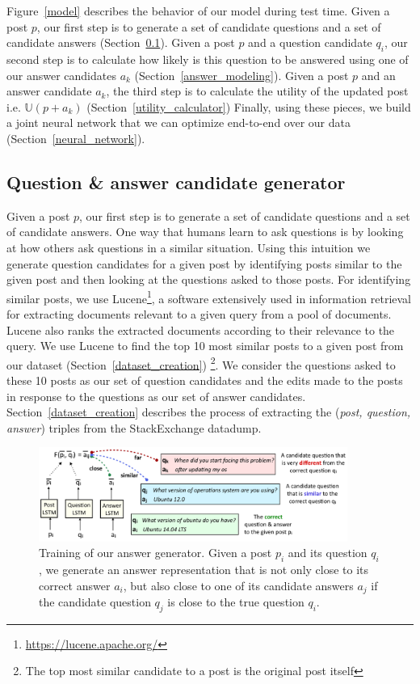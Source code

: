 \documentclass[11pt,a4paper]{article}
\newcommand{\U}{\mathbb{U}}
\begin{document}
Figure~\ref{model} describes the behavior of our model during test time. 
Given a post $p$, our first step is to generate a set of candidate questions and a set of candidate answers (Section~\ref{question_candidate_generator}).
Given a post $p$ and a question candidate $q_i$, our second step is to calculate how likely is this question to be answered using one of our answer candidates $a_k$ (Section~\ref{answer_modeling}).
Given a post $p$ and an answer candidate $a_k$, the third step is to calculate the utility of the updated post i.e. $\U(p + a_k)$ (Section~\ref{utility_calculator})
Finally, using these pieces, we build a joint neural network that we can optimize end-to-end over our data (Section~\ref{neural_network}).

\subsection{Question \& answer candidate generator}\label{question_candidate_generator}

Given a post $p$, our first step is to generate a set of candidate questions and a set of candidate answers. One way that humans learn to ask questions is by looking at how others ask questions in a similar situation. Using this intuition we generate question candidates for a given post by identifying posts similar to the given post and then looking at the questions asked to those posts. For identifying similar posts, we use Lucene\footnote{\url{https://lucene.apache.org/}}, a software extensively used in information retrieval for extracting documents relevant to a given query from a pool of documents. Lucene also ranks the extracted documents according to their relevance to the query. We use Lucene to find the top 10 most similar posts to a given post from our dataset (Section~\ref{dataset_creation}) \footnote{The top most similar candidate to a post is the original post itself}. We consider the questions asked to these 10 posts as our set of question candidates and the edits made to the posts in response to the questions as our set of answer candidates. Section~\ref{dataset_creation} describes the process of extracting the (\textit{post, question, answer}) triples from the StackExchange datadump. 

\begin{figure}[ht]
	\centering
	\includegraphics[width=0.9\textwidth]{answer_generator}
	\caption{Training of our answer generator. Given a post $p_i$ and its question $q_i$, we generate an answer representation that is not only close to its correct answer $a_i$, but also close to one of its candidate answers $a_j$ if the candidate question $q_j$ is close to the true question $q_i$.}
	\label{fig_answer_generator}
\end{figure}
\end{document}
